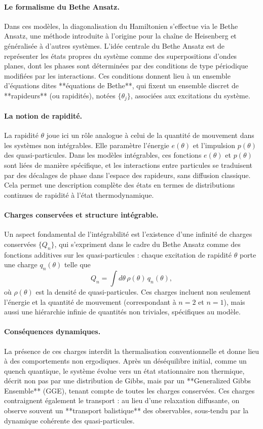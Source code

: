 \paragraph{Le formalisme du Bethe Ansatz.}
Dans ces modèles, la diagonalisation du Hamiltonien s’effectue via le Bethe Ansatz, une méthode introduite à l’origine pour la chaîne de Heisenberg et généralisée à d'autres systèmes. L’idée centrale du Bethe Ansatz est de représenter les états propres du système comme des superpositions d’ondes planes, dont les phases sont déterminées par des conditions de type périodique modifiées par les interactions. Ces conditions donnent lieu à un ensemble d’équations dites **équations de Bethe**, qui fixent un ensemble discret de **rapideurs** (ou rapidités), notées $\{\theta_j\}$, associées aux excitations du système.

\paragraph{La notion de rapidité.}
La rapidité $\theta$ joue ici un rôle analogue à celui de la quantité de mouvement dans les systèmes non intégrables. Elle paramètre l’énergie $e(\theta)$ et l’impulsion $p(\theta)$ des quasi-particules. Dans les modèles intégrables, ces fonctions $e(\theta)$ et $p(\theta)$ sont liées de manière spécifique, et les interactions entre particules se traduisent par des décalages de phase dans l’espace des rapideurs, sans diffusion classique. Cela permet une description complète des états en termes de distributions continues de rapidité à l’état thermodynamique.

\paragraph{Charges conservées et structure intégrable.}
Un aspect fondamental de l’intégrabilité est l’existence d’une infinité de charges conservées $\{Q_n\}$, qui s’expriment dans le cadre du Bethe Ansatz comme des fonctions additives sur les quasi-particules : chaque excitation de rapidité $\theta$ porte une charge $q_n(\theta)$ telle que
\[
Q_n = \int d\theta\, \rho(\theta)\, q_n(\theta),
\]
où $\rho(\theta)$ est la densité de quasi-particules. Ces charges incluent non seulement l’énergie et la quantité de mouvement (correspondant à $n=2$ et $n=1$), mais aussi une hiérarchie infinie de quantités non triviales, spécifiques au modèle.

\paragraph{Conséquences dynamiques.}
La présence de ces charges interdit la thermalisation conventionnelle et donne lieu à des comportements non ergodiques. Après un déséquilibre initial, comme un quench quantique, le système évolue vers un état stationnaire non thermique, décrit non pas par une distribution de Gibbs, mais par un **Generalized Gibbs Ensemble** (GGE), tenant compte de toutes les charges conservées. Ces charges contraignent également le transport : au lieu d’une relaxation diffusante, on observe souvent un **transport balistique** des observables, sous-tendu par la dynamique cohérente des quasi-particules.

